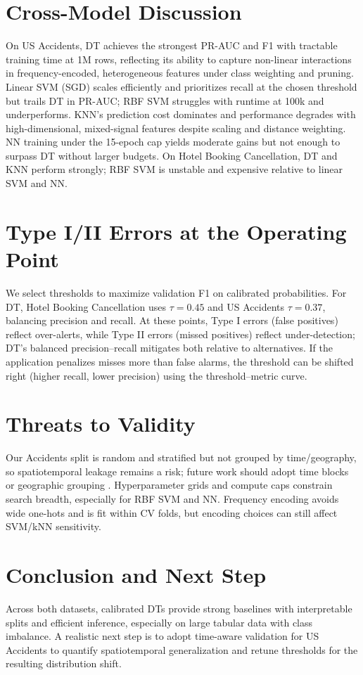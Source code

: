 \documentclass[conference]{IEEEtran}
\newcommand{\datasetA}{Hotel Booking Cancellation}
\newcommand{\datasetB}{US Accidents}
\begin{document}
\section{Cross-Model Discussion}
On \datasetB{}, DT achieves the strongest PR-AUC and F1 with tractable training time at 1M rows, reflecting its ability to capture non-linear interactions in frequency-encoded, heterogeneous features under class weighting and pruning. Linear SVM (SGD) scales efficiently and prioritizes recall at the chosen threshold but trails DT in PR-AUC; RBF SVM struggles with runtime at 100k and underperforms. KNN's prediction cost dominates and performance degrades with high-dimensional, mixed-signal features despite scaling and distance weighting. NN training under the 15-epoch cap yields moderate gains but not enough to surpass DT without larger budgets. On \datasetA{}, DT and KNN perform strongly; RBF SVM is unstable and expensive relative to linear SVM and NN.

\section{Type I/II Errors at the Operating Point}
We select thresholds to maximize validation F1 on calibrated probabilities. For DT, \datasetA{} uses $\tau\!=\!0.45$ and \datasetB{} $\tau\!=\!0.37$, balancing precision and recall. At these points, Type I errors (false positives) reflect over-alerts, while Type II errors (missed positives) reflect under-detection; DT's balanced precision–recall mitigates both relative to alternatives. If the application penalizes misses more than false alarms, the threshold can be shifted right (higher recall, lower precision) using the threshold–metric curve.

\section{Threats to Validity}
Our Accidents split is random and stratified but not grouped by time/geography, so spatiotemporal leakage remains a risk; future work should adopt time blocks or geographic grouping \cite{Roberts2017BlockedCV}. Hyperparameter grids and compute caps constrain search breadth, especially for RBF SVM and NN. Frequency encoding avoids wide one-hots and is fit within CV folds, but encoding choices can still affect SVM/kNN sensitivity.

\section{Conclusion and Next Step}
Across both datasets, calibrated DTs provide strong baselines with interpretable splits and efficient inference, especially on large tabular data with class imbalance. A realistic next step is to adopt time-aware validation for \datasetB{} to quantify spatiotemporal generalization and retune thresholds for the resulting distribution shift.
\end{document}
